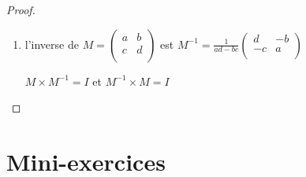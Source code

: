 \begin{frame}
\begin{proof}
\begin{enumerate}
\pause

  \item l'inverse de  $M=\left(\begin{smallmatrix} a & b \\ c & d \\ \end{smallmatrix}\right)$
est $M^{-1} = \frac{1}{ad-bc} \left(\begin{smallmatrix} d & -b \\ -c & a\\ \end{smallmatrix}\right)$

$M \times M^{-1} = I$ et $M^{-1} \times M = I$


\end{enumerate}

\end{proof}   
\end{frame}


\section*{Mini-exercices}




